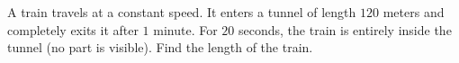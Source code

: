 A train travels at a constant speed. It enters a tunnel of length $120$ meters and completely exits it after $1$ minute. For $20$ seconds, the train is entirely inside the tunnel (no part is visible). Find the length of the train.
